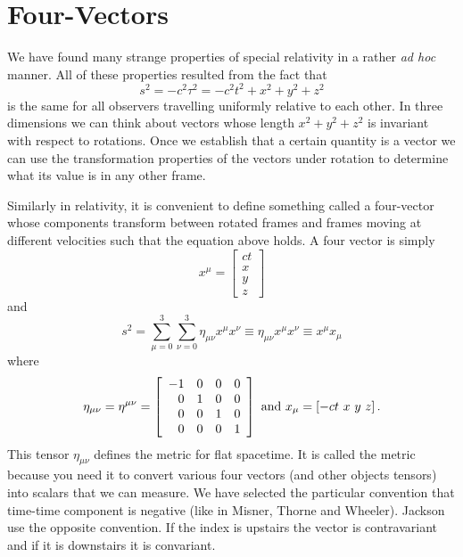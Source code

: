 \section{Four-Vectors}
\label{sec:four-vectors}

We have found many strange properties of special relativity in a
rather {\em ad hoc} manner.  All of these properties resulted from the
fact that
\begin{equation}
s^2 = -c^2 \tau^2 = -c^2 t^2 + x^2 + y^2 + z^2
\label{eq:278}
\end{equation}
is the same for all observers travelling uniformly relative to each
other.   In three dimensions we can think about vectors whose length
$x^2+y^2+z^2$ is invariant with respect to rotations.  Once we
establish that a certain quantity is a vector we can use the
transformation properties of the vectors under rotation to determine
what its value is in any other frame.

Similarly in relativity, it is convenient to define something called a
four-vector whose components transform between rotated frames and
frames moving at different velocities such that the equation above
holds.  A four vector is simply
\begin{equation}
x^\mu = \left [ \begin{array}{c} ct \\ x\\ y\\ z \end{array} \right ]
\label{eq:279}
\end{equation}
and 
\begin{equation}
s^2 = \sum_{\mu=0}^3 \sum_{\nu=0}^3 \eta_{\mu\nu} x^\mu x^\nu \equiv
\eta_{\mu\nu} x^\mu x^\nu \equiv  x^\mu x_\mu 
\label{eq:280}
\end{equation}
where
\begin{equation}
\eta_{\mu\nu} = \eta^{\mu\nu} = \left [ 
\begin{array}{rrrr}
-1 & 0 & 0 & 0 \\
 0 & 1 & 0 & 0 \\
 0 & 0 & 1 & 0 \\
 0 & 0 & 0 & 1 
\end{array}
\right ]
~\hbox{\rm and}~
x_\mu = \left [ -ct~x~y~z \right ].
\label{eq:281}
\end{equation}
This tensor $\eta_{\mu\nu}$ defines the metric for flat spacetime.  It
is called the metric because you need it to convert various four
vectors (and other objects tensors) into scalars that we can measure.
We have selected the particular convention that time-time component is
negative (like in Misner, Thorne and Wheeler).  Jackson use the
opposite convention.  If the index is upstairs the vector is
contravariant and if it is downstairs it is convariant.

